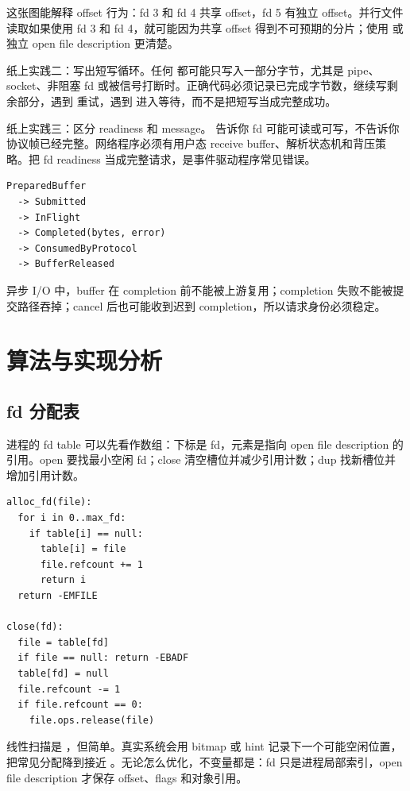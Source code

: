 这张图能解释 offset 行为：fd 3 和 fd 4 共享 offset，fd 5 有独立 offset。并行文件读取如果使用 fd 3 和 fd 4，就可能因为共享 offset 得到不可预期的分片；使用  或独立 open file description 更清楚。

纸上实践二：写出短写循环。任何  都可能只写入一部分字节，尤其是 pipe、socket、非阻塞 fd 或被信号打断时。正确代码必须记录已完成字节数，继续写剩余部分，遇到  重试，遇到  进入等待，而不是把短写当成完整成功。

纸上实践三：区分 readiness 和 message。 告诉你 fd 可能可读或可写，不告诉你协议帧已经完整。网络程序必须有用户态 receive buffer、解析状态机和背压策略。把 fd readiness 当成完整请求，是事件驱动程序常见错误。

\begin{lstlisting}
PreparedBuffer
  -> Submitted
  -> InFlight
  -> Completed(bytes, error)
  -> ConsumedByProtocol
  -> BufferReleased
\end{lstlisting}

异步 I/O 中，buffer 在 completion 前不能被上游复用；completion 失败不能被提交路径吞掉；cancel 后也可能收到迟到 completion，所以请求身份必须稳定。

\section{算法与实现分析}

\subsection{fd 分配表}

进程的 fd table 可以先看作数组：下标是 fd，元素是指向 open file description 的引用。open 要找最小空闲 fd；close 清空槽位并减少引用计数；dup 找新槽位并增加引用计数。

\begin{lstlisting}
alloc_fd(file):
  for i in 0..max_fd:
    if table[i] == null:
      table[i] = file
      file.refcount += 1
      return i
  return -EMFILE

close(fd):
  file = table[fd]
  if file == null: return -EBADF
  table[fd] = null
  file.refcount -= 1
  if file.refcount == 0:
    file.ops.release(file)
\end{lstlisting}

线性扫描是 ，但简单。真实系统会用 bitmap 或 hint 记录下一个可能空闲位置，把常见分配降到接近 。无论怎么优化，不变量都是：fd 只是进程局部索引，open file description 才保存 offset、flags 和对象引用。


